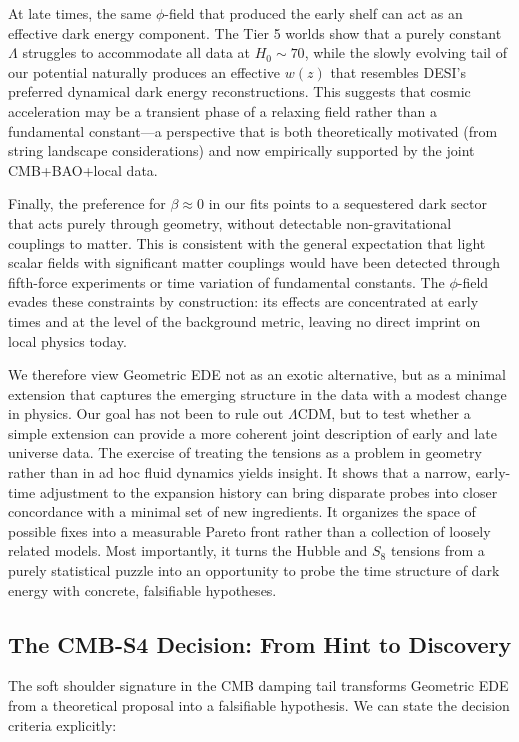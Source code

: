 \documentclass[a4paper,11pt]{article}
\begin{document}
At late times, the same $\phi$-field that produced the early shelf can act as an effective dark energy component. The Tier 5 worlds show that a purely constant $\Lambda$ struggles to accommodate all data at $H_0 \sim 70$, while the slowly evolving tail of our potential naturally produces an effective $w(z)$ that resembles DESI's preferred dynamical dark energy reconstructions. This suggests that cosmic acceleration may be a transient phase of a relaxing field rather than a fundamental constant---a perspective that is both theoretically motivated (from string landscape considerations) and now empirically supported by the joint CMB+BAO+local data.

Finally, the preference for $\beta \approx 0$ in our fits points to a sequestered dark sector that acts purely through geometry, without detectable non-gravitational couplings to matter. This is consistent with the general expectation that light scalar fields with significant matter couplings would have been detected through fifth-force experiments or time variation of fundamental constants. The $\phi$-field evades these constraints by construction: its effects are concentrated at early times and at the level of the background metric, leaving no direct imprint on local physics today.

We therefore view Geometric EDE not as an exotic alternative, but as a minimal extension that captures the emerging structure in the data with a modest change in physics. Our goal has not been to rule out $\Lambda$CDM, but to test whether a simple extension can provide a more coherent joint description of early and late universe data. The exercise of treating the tensions as a problem in geometry rather than in ad hoc fluid dynamics yields insight. It shows that a narrow, early-time adjustment to the expansion history can bring disparate probes into closer concordance with a minimal set of new ingredients. It organizes the space of possible fixes into a measurable Pareto front rather than a collection of loosely related models. Most importantly, it turns the Hubble and $S_8$ tensions from a purely statistical puzzle into an opportunity to probe the time structure of dark energy with concrete, falsifiable hypotheses.

\subsection*{The CMB-S4 Decision: From Hint to Discovery}
\label{sec:s4_decision}

The soft shoulder signature in the CMB damping tail transforms Geometric EDE from a theoretical proposal into a falsifiable hypothesis. We can state the decision criteria explicitly:
\end{document}
